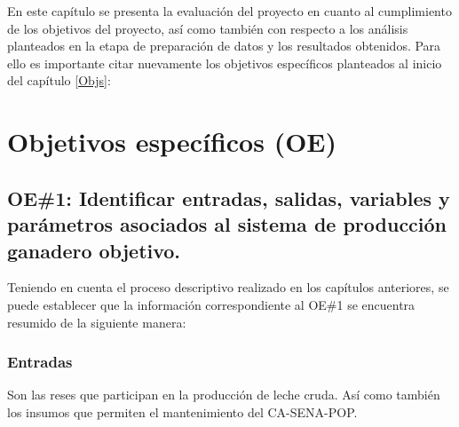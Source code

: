 

En este capítulo se presenta la evaluación del proyecto en cuanto al cumplimiento de los objetivos del proyecto, así como también con respecto a los análisis planteados en la etapa de preparación de datos y los resultados obtenidos. Para ello es importante citar nuevamente los objetivos específicos planteados al inicio del capítulo \ref{Objs}:

\section{Objetivos específicos (OE)}\label{objesp}
\subsection{OE\#1: Identificar entradas, salidas, variables y parámetros asociados al sistema de producción ganadero objetivo.}

Teniendo en cuenta el proceso descriptivo realizado en los capítulos anteriores, se puede establecer que la información correspondiente al OE\#1 se encuentra resumido de la siguiente manera:

\subsubsection{Entradas}
Son las reses que participan en la producción de leche cruda. Así como también los insumos  que permiten el mantenimiento del CA-SENA-POP.

